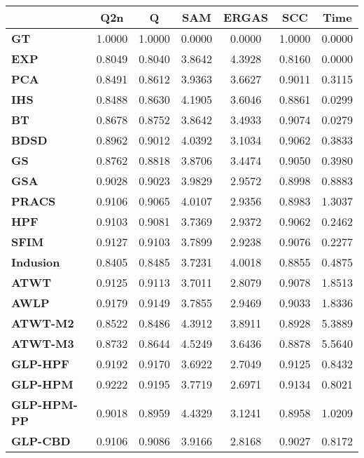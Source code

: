 \begin{tabular}{|l|c|c|c|c|c|c|}
\hline
&\textbf{Q2n}&\textbf{Q}&\textbf{SAM}&\textbf{ERGAS}&\textbf{SCC}&\textbf{Time}\\\hline
\textbf{GT}&1.0000&1.0000&0.0000&0.0000&1.0000&0.0000\\\hline
\textbf{EXP}&0.8049&0.8040&3.8642&4.3928&0.8160&0.0000\\\hline
\textbf{PCA}&0.8491&0.8612&3.9363&3.6627&0.9011&0.3115\\\hline
\textbf{IHS}&0.8488&0.8630&4.1905&3.6046&0.8861&0.0299\\\hline
\textbf{BT}&0.8678&0.8752&3.8642&3.4933&0.9074&0.0279\\\hline
\textbf{BDSD}&0.8962&0.9012&4.0392&3.1034&0.9062&0.3833\\\hline
\textbf{GS}&0.8762&0.8818&3.8706&3.4474&0.9050&0.3980\\\hline
\textbf{GSA}&0.9028&0.9023&3.9829&2.9572&0.8998&0.8883\\\hline
\textbf{PRACS}&0.9106&0.9065&4.0107&2.9356&0.8983&1.3037\\\hline
\textbf{HPF}&0.9103&0.9081&3.7369&2.9372&0.9062&0.2462\\\hline
\textbf{SFIM}&0.9127&0.9103&3.7899&2.9238&0.9076&0.2277\\\hline
\textbf{Indusion}&0.8405&0.8485&3.7231&4.0018&0.8855&0.4875\\\hline
\textbf{ATWT}&0.9125&0.9113&3.7011&2.8079&0.9078&1.8513\\\hline
\textbf{AWLP}&0.9179&0.9149&3.7855&2.9469&0.9033&1.8336\\\hline
\textbf{ATWT-M2}&0.8522&0.8486&4.3912&3.8911&0.8928&5.3889\\\hline
\textbf{ATWT-M3}&0.8732&0.8644&4.5249&3.6436&0.8878&5.5640\\\hline
\textbf{GLP-HPF}&0.9192&0.9170&3.6922&2.7049&0.9125&0.8432\\\hline
\textbf{GLP-HPM}&0.9222&0.9195&3.7719&2.6971&0.9134&0.8021\\\hline
\textbf{GLP-HPM-PP}&0.9018&0.8959&4.4329&3.1241&0.8958&1.0209\\\hline
\textbf{GLP-CBD}&0.9106&0.9086&3.9166&2.8168&0.9027&0.8172\\\hline
\end{tabular}
